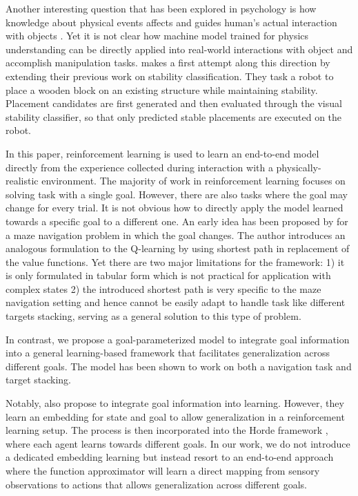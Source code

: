 Another interesting question that has been explored in psychology is how knowledge about physical events affects and guides human's actual interaction with objects \cite{yildirim2017physical}. 
Yet it is not clear how machine model trained for physics understanding can be directly applied into real-world interactions with object and accomplish manipulation tasks.  
\cite{li2017visual} makes a first attempt along this direction by extending their previous work \citep{li2016fall} on stability classification. They task a robot to place a wooden block on an existing structure while maintaining stability. Placement candidates are first generated and then evaluated through the visual stability classifier, so that only predicted stable placements are executed on the robot. 

In this paper, reinforcement learning is used to learn an end-to-end model directly from the experience collected during interaction with a physically-realistic environment.
The majority of work in reinforcement learning focuses on solving task with a single goal. However, there are also tasks where the goal may change for every trial. It is not obvious how to directly apply the model learned towards a specific goal to a different one. An early idea has been proposed by \cite{kaelbling1993learning} for a maze navigation problem in which the goal changes. The author introduces an analogous formulation to the Q-learning by using shortest path in replacement of the value functions. 
Yet there are two major limitations for the framework: 1) it is only formulated in tabular form which is not practical for application with complex states 2) the introduced shortest path is very specific to the maze navigation setting and hence cannot be easily adapt to handle task like different targets stacking, serving as a general solution to this type of problem. 

In contrast, we propose a goal-parameterized model to integrate goal information into a general learning-based framework that facilitates generalization across different goals. The model has been shown to work on both a navigation task and target stacking.

Notably, \cite{schaul2015universal} also propose to integrate goal information into learning. However, they learn an embedding for state and goal to allow generalization in a reinforcement learning setup. The process is then incorporated into the Horde framework \citet{sutton2011horde}, where each agent learns towards different goals. In our work, we do not introduce a dedicated embedding learning but instead resort to an end-to-end approach where the function approximator will learn a direct mapping from sensory observations to actions that allows generalization across different goals.
